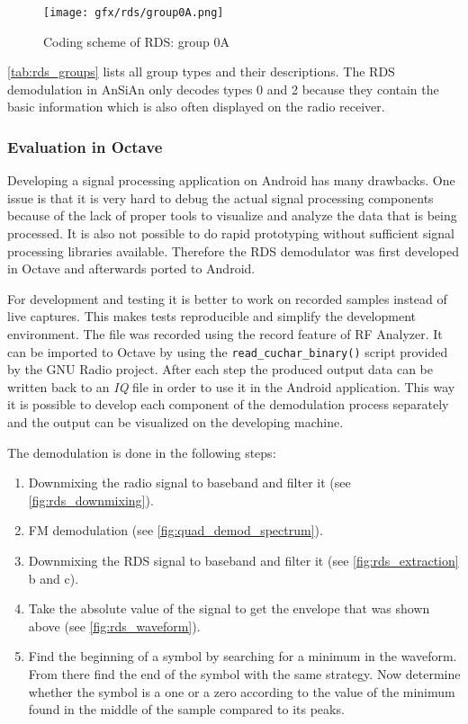\begin{figure}
	\centering
	\texttt{[image: gfx/rds/group0A.png]}
	\caption[Coding scheme of RDS: group 0A]{Coding scheme of RDS: group 0A \cite{1999:iec62106}}
	\label{fig:rds_group0A}
\end{figure}

\autoref{tab:rds_groups} lists all group types and their descriptions.
The \ac{RDS} demodulation in AnSiAn only decodes types 0 and 2 because they contain
the basic information which is also often displayed on the radio
receiver.


\subsubsection{Evaluation in Octave}

Developing a signal processing application on Android has many drawbacks. One
issue is that it is very hard to debug the actual signal processing components
because of the lack of proper tools to visualize and analyze the data that is
being processed. It is also not possible to do rapid prototyping without
sufficient signal processing libraries available. Therefore the \ac{RDS}
demodulator was first developed in Octave and afterwards ported to Android.

For development and testing it is better to work on recorded samples instead
of live captures. This makes tests reproducible and simplify the development
environment. The file was recorded using the record feature of RF Analyzer. It
can be imported to Octave by using the \texttt{read\_cuchar\_binary()} script
provided by the GNU Radio project. After each step the produced output data
can be written back to an \emph{IQ} file in order to use it in the Android application.
This way it is possible to develop each component of the demodulation process
separately and the output can be visualized on the developing machine.

The demodulation is done in the following steps:
\begin{enumerate}
	\item Downmixing the radio signal to baseband and filter it (see 
		\autoref{fig:rds_downmixing}).
	\item \ac{FM} demodulation (see \autoref{fig:quad_demod_spectrum}).
	\item Downmixing the \ac{RDS} signal to baseband and filter it
		(see \autoref{fig:rds_extraction} b and c).
	\item Take the absolute value of the signal to get the envelope
		that was shown above (see \autoref{fig:rds_waveform}).
	\item Find the beginning of a symbol by searching for a minimum in
		the waveform. From there find the end of the symbol with the
		same strategy. Now determine whether the symbol is a one or a
		zero according to the value of the minimum found in the middle
		of the sample compared to its peaks.
\end{enumerate}


